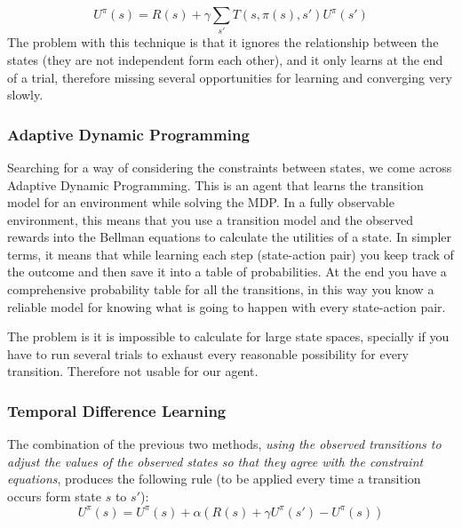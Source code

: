 
\begin{equation}
U^\pi(s) = R(s)+\gamma\sum_{s'}T(s,\pi(s),s') U^\pi(s')
\end{equation}
The problem with this technique is that it ignores the relationship between the states (they are not independent form each other), and it only learns at the end of a trial, therefore missing several opportunities for learning and converging very slowly\cite{rl}.

\subsubsection{Adaptive Dynamic Programming}

Searching for a way of considering the constraints between states, we come across Adaptive Dynamic Programming. This is an agent that learns the transition model for an environment while solving the MDP. In a fully observable environment, this means that you use a transition model and the observed rewards into the Bellman equations to calculate the utilities of a state. In simpler terms, it means that while learning each step (state-action pair) you keep track of the outcome and then save it into a table of probabilities. At the end you have a comprehensive probability table for all the transitions, in this way you know a reliable model for knowing what is going to happen with every state-action pair\cite{rl}.

The problem is it is impossible to calculate for large state spaces, specially if you have to run several trials to exhaust every reasonable possibility for every transition. Therefore not usable for our agent. 

\subsubsection{Temporal Difference Learning}

The combination of the previous two methods, \textit{using the observed transitions to adjust the values of the observed states so that they agree with the constraint equations}\cite[p767]{rl}, produces the following rule (to be applied every time a transition occurs form state $s$ to $s'$):\\

\begin{equation}
U^\pi(s) = U^\pi(s) + \alpha(R(s)+\gamma U^\pi(s') -  U^\pi(s))
\end{equation}

